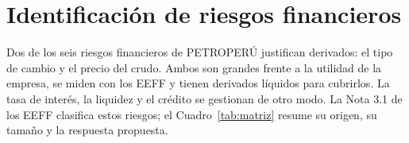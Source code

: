 \section{Identificación de riesgos financieros}

Dos de los seis riesgos financieros de PETROPERÚ justifican derivados: el tipo de cambio y el precio del crudo.
Ambos son grandes frente a la utilidad de la empresa, se miden con los EEFF y tienen derivados líquidos para
cubrirlos. La tasa de interés, la liquidez y el crédito se gestionan de otro modo. La Nota 3.1 de los EEFF clasifica
estos riesgos; el Cuadro~\ref{tab:matriz} resume su origen, su tamaño y la respuesta propuesta.


